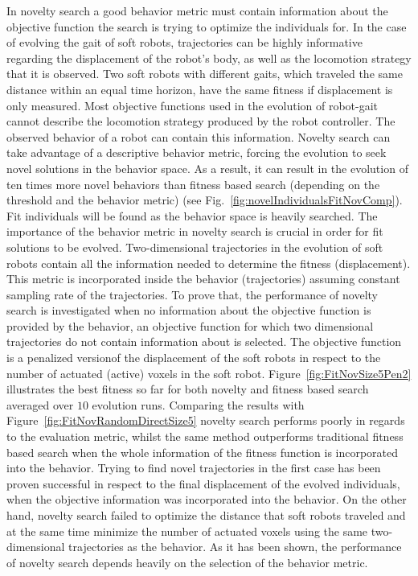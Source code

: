 In novelty search a good behavior metric must contain information about the objective function the search is trying to optimize the individuals for. In the case of evolving the gait of soft robots, trajectories can be highly informative regarding the displacement of the robot's body, as well as the locomotion strategy that it is observed. Two soft robots with different gaits, which traveled the same distance within an equal time horizon, have the same fitness if displacement is only measured. Most objective functions used in the evolution of robot-gait cannot describe the locomotion strategy produced by the robot controller. The observed behavior of a robot can contain this information. Novelty search can take advantage of a descriptive behavior metric, forcing the evolution to seek novel solutions in the behavior space. As a result, it can result in the evolution of ten times more novel behaviors than fitness based search (depending on the threshold and the behavior metric) (see Fig.~\ref{fig:novelIndividualsFitNovComp}). Fit individuals will be found as the behavior space is heavily searched. The importance of the behavior metric in novelty search is crucial in order for fit solutions to be evolved. Two-dimensional trajectories in the evolution of soft robots contain all the information needed to determine the fitness (displacement). This metric is incorporated inside the behavior (trajectories) assuming constant sampling rate of the trajectories. To prove that, the performance of novelty search is investigated when no information about the objective function is provided by the behavior, an objective function for which two dimensional trajectories do not contain information about is selected. The objective function is a penalized version\footnotemark of the displacement of the soft robots in respect to the number of actuated (active) voxels in the soft robot. Figure~\ref{fig:FitNovSize5Pen2} illustrates the best fitness so far for both novelty and fitness based search averaged over $10$ evolution runs. Comparing the results with Figure~\ref{fig:FitNovRandomDirectSize5} novelty search performs poorly in regards to the evaluation metric, whilst the same method outperforms traditional fitness based search when the whole information of the fitness function is incorporated into the behavior. Trying to find novel trajectories in the first case has been proven successful in respect to the final displacement of the evolved individuals, when the objective information was incorporated into the behavior. On the other hand, novelty search failed to optimize the distance that soft robots traveled and at the same time minimize the number of actuated voxels using the same two-dimensional trajectories as the behavior. As it has been shown, the performance of novelty search depends heavily on the selection of the behavior metric.


